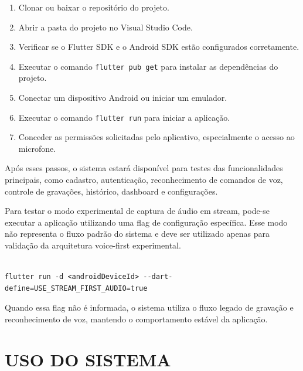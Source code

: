 \documentclass[12pt,oneside,a4paper,brazil,final]{abntex2}
\begin{document}
\begin{apendicesenv}
\begin{enumerate}
    \item Clonar ou baixar o repositório do projeto.

    \item Abrir a pasta do projeto no Visual Studio Code.

    \item Verificar se o Flutter SDK e o Android SDK estão configurados corretamente.

    \item Executar o comando \texttt{flutter pub get} para instalar as dependências do projeto.

    \item Conectar um dispositivo Android ou iniciar um emulador.

    \item Executar o comando \texttt{flutter run} para iniciar a aplicação.

    \item Conceder as permissões solicitadas pelo aplicativo, especialmente o acesso ao microfone.

\end{enumerate}



Após esses passos, o sistema estará disponível para testes das funcionalidades principais, como cadastro, autenticação, reconhecimento de comandos de voz, controle de gravações, histórico, dashboard e configurações.



Para testar o modo experimental de captura de áudio em stream, pode-se executar a aplicação utilizando uma flag de configuração específica. Esse modo não representa o fluxo padrão do sistema e deve ser utilizado apenas para validação da arquitetura voice-first experimental.



\begin{verbatim}

flutter run -d <androidDeviceId> --dart-define=USE_STREAM_FIRST_AUDIO=true

\end{verbatim}



Quando essa flag não é informada, o sistema utiliza o fluxo legado de gravação e reconhecimento de voz, mantendo o comportamento estável da aplicação.



\section{USO DO SISTEMA}




\end{apendicesenv}
\end{document}
